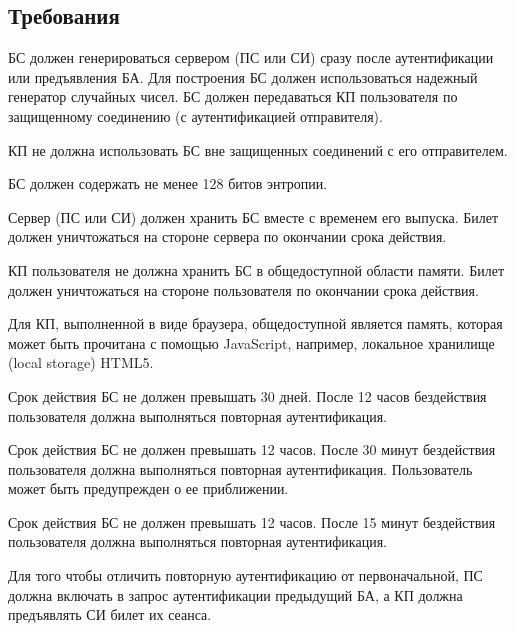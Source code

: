 \subsection{Требования}\label{SM.Reqs}

БС должен генерироваться сервером (ПС или СИ) сразу после аутентификации или 
предъявления БА. Для построения БС должен использоваться надежный генератор 
случайных чисел. БС должен передаваться КП пользователя по защищенному соединению
(с аутентификацией отправителя). 

КП не должна использовать БС вне защищенных соединений с его отправителем. 

БС должен содержать не менее 128 битов энтропии.


Сервер (ПС или СИ) должен хранить БС вместе с временем его выпуска.
Билет должен уничтожаться на стороне сервера по окончании срока действия.

КП пользователя не должна хранить БС в общедоступной области памяти.
Билет должен уничтожаться на стороне пользователя по окончании срока действия.

\begin{note*}
Для КП, выполненной в виде браузера, общедоступной является память,
которая может быть прочитана с помощью JavaScript, например,
локальное хранилище (local storage) HTML5.
%
\end{note*}

Срок действия БС не должен превышать 30 дней.
После 12 часов бездействия пользователя 
должна выполняться повторная аутентификация.

Срок действия БС не должен превышать 12 часов.
После 30 минут бездействия пользователя 
должна выполняться повторная аутентификация.
Пользователь может быть предупрежден о ее приближении.


Срок действия БС не должен превышать 12 часов.
После 15 минут бездействия пользователя 
должна выполняться повторная аутентификация.


Для того чтобы отличить повторную аутентификацию от первоначальной,
ПС должна включать в запрос аутентификации предыдущий БА,
а КП должна предъявлять СИ билет их сеанса.

